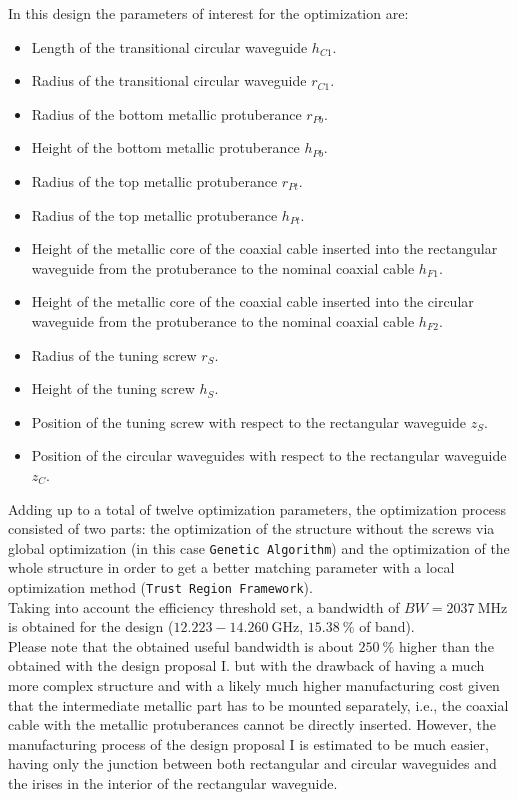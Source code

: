 \documentclass[english,twoside]{article}
\begin{document}
		In this design the parameters of interest for the optimization are:
		\begin{itemize}
			\item Length of the transitional circular waveguide $h_{C1}$.
			\item Radius of the transitional circular waveguide $r_{C1}$.
			\item Radius of the bottom metallic protuberance $r_{Pb}$.
			\item Height of the bottom metallic protuberance $h_{Pb}$.
			\item Radius of the top metallic protuberance $r_{Pt}$.
			\item Radius of the top metallic protuberance $h_{Pt}$.
			\item Height of the metallic core of the coaxial cable inserted into the rectangular waveguide from the protuberance to the nominal coaxial cable $h_{F1}$.
			\item Height of the metallic core of the coaxial cable inserted into the circular waveguide from the protuberance to the nominal coaxial cable $h_{F2}$.
			\item Radius of the tuning screw $r_S$.
			\item Height of the tuning screw $h_S$.
			\item Position of the tuning screw with respect to the rectangular waveguide $z_S$.
			\item Position of the circular waveguides with respect to the rectangular waveguide $z_C$.
		\end{itemize}
	
		Adding up to a total of twelve optimization parameters, the optimization process consisted of two parts: the optimization of the structure without the screws via global optimization (in this case \texttt{Genetic Algorithm}) and the optimization of the whole structure in order to get a better matching parameter with a local optimization method (\texttt{Trust Region Framework}).\\
		
		Taking into account the efficiency threshold set, a bandwidth of $BW=\SI{2037}{\mega\hertz}$ is obtained for the design ($\num{12.223}-\SI{14.260}{\giga\hertz}$, $\SI{15.38}{\percent}$ of band).\\

    Please note that the obtained useful bandwidth is about $\SI{250}{\percent}$ higher than the obtained with the design proposal I. but with the drawback of having a much more complex structure and with a likely much higher manufacturing cost given that the intermediate metallic part has to be mounted separately, i.e., the coaxial cable with the metallic protuberances cannot be directly inserted. However, the manufacturing process of the design proposal I is estimated to be much easier, having only the junction between both rectangular and circular waveguides and the irises in the interior of the rectangular waveguide.
		
\end{document}
